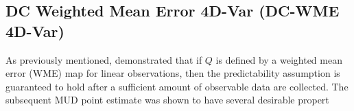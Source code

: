 \documentclass[final,1p,times]{elsarticle}
\begin{document}
\subsection{DC Weighted Mean Error 4D-Var (DC-WME 4D-Var)}
As previously mentioned, \cite{Pilosov2023} demonstrated that if $Q$ is defined by a weighted mean error (WME) map for linear observations, then the predictability assumption is guaranteed to hold after a sufficient amount of observable data are collected.
The subsequent MUD point estimate was shown to have several desirable propert
\end{document}
